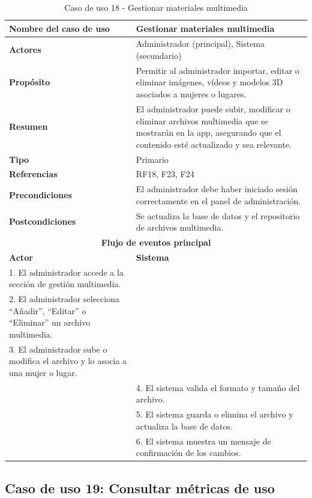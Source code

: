 \begin{table}[H]
\centering
\caption{Caso de uso 18 - Gestionar materiales multimedia}
\begin{tabular}{|p{4.5cm}|p{10.5cm}|}
\hline
\textbf{Nombre del caso de uso} & Gestionar materiales multimedia \\
\hline
\textbf{Actores} & Administrador (principal), Sistema (secundario) \\
\hline
\textbf{Propósito} & Permitir al administrador importar, editar o eliminar imágenes, vídeos y modelos 3D asociados a mujeres o lugares. \\
\hline
\textbf{Resumen} & El administrador puede subir, modificar o eliminar archivos multimedia que se mostrarán en la app, asegurando que el contenido esté actualizado y sea relevante. \\
\hline
\textbf{Tipo} & Primario \\
\hline
\textbf{Referencias} & RF18, F23, F24 \\
\hline
\textbf{Precondiciones} & El administrador debe haber iniciado sesión correctamente en el panel de administración. \\
\hline
\textbf{Postcondiciones} & Se actualiza la base de datos y el repositorio de archivos multimedia. \\
\hline
\multicolumn{2}{|c|}{\textbf{Flujo de eventos principal}} \\
\hline
\textbf{Actor} & \textbf{Sistema} \\
\hline
1. El administrador accede a la sección de gestión multimedia. & \\
\hline
2. El administrador selecciona “Añadir”, “Editar” o “Eliminar” un archivo multimedia. & \\
\hline
3. El administrador sube o modifica el archivo y lo asocia a una mujer o lugar. & \\
\hline
& 4. El sistema valida el formato y tamaño del archivo. \\
\hline
& 5. El sistema guarda o elimina el archivo y actualiza la base de datos. \\
\hline
& 6. El sistema muestra un mensaje de confirmación de los cambios. \\
\hline
\end{tabular}
\end{table}

\subsection{Caso de uso 19: Consultar métricas de uso}

